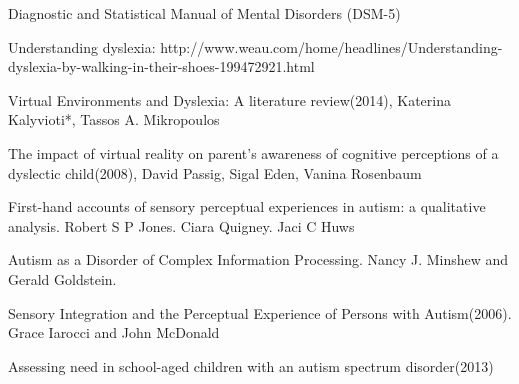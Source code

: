 \documentclass[11pt]{report}
\begin{document}
\begin{thebibliography}{9}
Diagnostic and Statistical Manual of Mental Disorders (DSM-5)

Understanding dyslexia: http://www.weau.com/home/headlines/Understanding-dyslexia-by-walking-in-their-shoes-199472921.html

Virtual Environments and Dyslexia: A literature review(2014), Katerina Kalyvioti*, Tassos A. Mikropoulos 

The impact of virtual reality on parent's awareness of cognitive perceptions of a dyslectic child(2008), David Passig, Sigal Eden, Vanina Rosenbaum

First-hand accounts of sensory perceptual experiences in autism: a qualitative analysis. Robert S P Jones. Ciara Quigney. Jaci C Huws

Autism as a Disorder of Complex Information Processing. Nancy J. Minshew and Gerald Goldstein. 

Sensory Integration and the Perceptual Experience of Persons with Autism(2006). Grace Iarocci and John McDonald

Assessing need in school-aged children with an autism spectrum disorder(2013)

\end{thebibliography}
\end{document}
